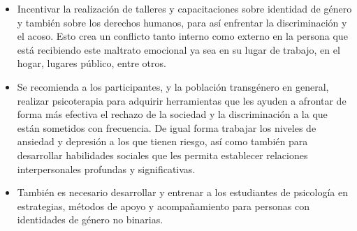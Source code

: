 \begin{itemize}
\item Incentivar la realización de talleres y capacitaciones sobre identidad de
género y también sobre los derechos humanos, para así enfrentar la
discriminación y el acoso. Esto crea un conflicto tanto interno como externo en
la persona que está recibiendo este maltrato emocional ya sea en su lugar de
trabajo, en el hogar, lugares público, entre otros.

\item Se recomienda a los participantes, y la población transgénero en general,
realizar psicoterapia para adquirir herramientas que les ayuden a afrontar de
forma más efectiva el rechazo de la sociedad y la discriminación a la que están
sometidos con frecuencia. De igual forma trabajar los niveles de ansiedad y
depresión a los que tienen riesgo, así como también para desarrollar habilidades
sociales que les permita establecer relaciones interpersonales profundas y
significativas.

\item También es necesario desarrollar y entrenar a los estudiantes de
psicología en estrategias, métodos de apoyo y acompañamiento para personas con
identidades de género no binarias.

\end{itemize}
